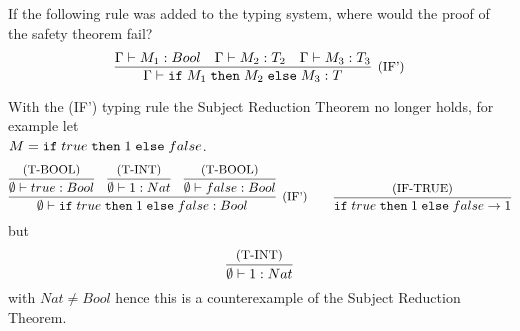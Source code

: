 \subsection{}

If the following rule was added to the typing system, where would the proof of the safety theorem fail?
\[
	\infer[\text{\small{(IF')}}]
	{\Gamma \vdash \IF{M_1}{M_2}{M_3}: T}
	{
		\Gamma \vdash M_1: Bool &
		\Gamma \vdash M_2: T_2 &
		\Gamma \vdash M_3: T_3
	}
\]

With the (IF') typing rule the Subject Reduction Theorem no longer holds, for example let\\
$M = \texttt{if}\;true\;\texttt{then}\;1\;\texttt{else}\;false$.
\[
	\infer[\text{\small{(IF')}}]
	{\emptyset \vdash \IF{true}{1}{false}: Bool}
	{
		\infer{\emptyset \vdash true: Bool}{\text{\small{(T-BOOL)}}} &
		\infer{\emptyset \vdash 1: Nat}{\text{\small{(T-INT)}}} &
		\infer{\emptyset \vdash false: Bool}{\text{\small{(T-BOOL)}}}
	}
	\qquad
	\infer{\IF{true}{1}{false} \to 1}{\text{\small{(IF-TRUE)}}}
\]
but
\[
	\infer{\emptyset \vdash 1: Nat}{\text{\small{(T-INT)}}}
\]
with $Nat \ne Bool$ hence this is a counterexample of the Subject Reduction Theorem.
